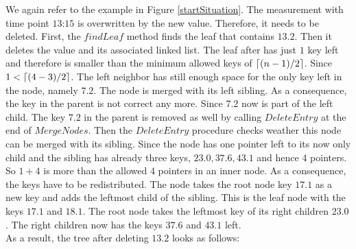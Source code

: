 \documentclass[abstracton,12pt,oneside]{scrreprt}
\DeclarePairedDelimiter\ceil{\lceil}{\rceil}
\begin{document}
\begin{exmp}
	We again refer to the example in Figure \ref{startSituation}. The measurement with time point $\text{13:15}$ is overwritten by the new value. Therefore, it needs to be deleted. First, the $findLeaf$ method finds the leaf that contains $13.2$. Then it deletes the value and its associated linked list. The leaf after has just $1$ key left and therefore is smaller than the minimum allowed keys of $\ceil{(n-1)/2}$. Since $1<\ceil{(4-3)/2}$. The left neighbor has still enough space for the only key left in the node, namely $7.2$. The node is merged with its left sibling. As a consequence, the key in the parent is not correct any more. Since $7.2$ now is part of the left child. The key $7.2$ in the parent is removed as well by calling $DeleteEntry$ at the end of $MergeNodes$. Then the $DeleteEntry$ procedure checks weather this node can be merged with its sibling. Since the node has one pointer left to its now only child and the sibling has already three keys, $23.0,37.6, 43.1$ and hence 4 pointers. So $1+4$ is more than the allowed $4$ pointers in an inner node. As a consequence, the keys have to be redistributed. The node takes the root node key $17.1$ as a new key and adds the leftmost child of the sibling. This is the leaf node with the keys $17.1$ and $18.1$. The root node takes the leftmost key of its right children $23.0$. The right children now has the keys $37.6$ and $43.1$ left. \\
	As a result, the tree after deleting $13.2$ looks as follows: 
\end{exmp}
\end{document}
